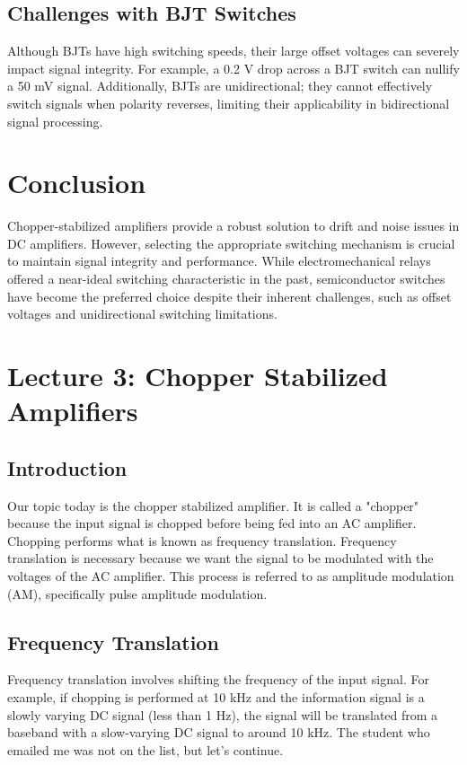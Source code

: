 \subsection{Challenges with BJT Switches}
Although BJTs have high switching speeds, their large offset voltages can severely impact signal integrity. For example, a 0.2 V drop across a BJT switch can nullify a 50 mV signal. Additionally, BJTs are unidirectional; they cannot effectively switch signals when polarity reverses, limiting their applicability in bidirectional signal processing.

\section{Conclusion}
Chopper-stabilized amplifiers provide a robust solution to drift and noise issues in DC amplifiers. However, selecting the appropriate switching mechanism is crucial to maintain signal integrity and performance. While electromechanical relays offered a near-ideal switching characteristic in the past, semiconductor switches have become the preferred choice despite their inherent challenges, such as offset voltages and unidirectional switching limitations.

\newpage
\section{Lecture 3: Chopper Stabilized Amplifiers}

\subsection{Introduction}
Our topic today is the chopper stabilized amplifier. It is called a "chopper" because the input signal is chopped before being fed into an AC amplifier. Chopping performs what is known as frequency translation. Frequency translation is necessary because we want the signal to be modulated with the voltages of the AC amplifier. This process is referred to as amplitude modulation (AM), specifically pulse amplitude modulation.

\subsection{Frequency Translation}
Frequency translation involves shifting the frequency of the input signal. For example, if chopping is performed at 10 kHz and the information signal is a slowly varying DC signal (less than 1 Hz), the signal will be translated from a baseband with a slow-varying DC signal to around 10 kHz. The student who emailed me was not on the list, but let's continue.

